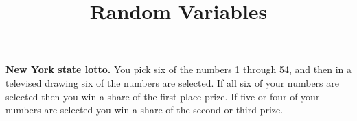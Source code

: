 \documentclass[11pt]{exam}
\title{Random Variables}
\begin{document}
\begin{questions}


%
%
%
%
%


\question \textbf{New York state lotto.}  You pick six of the numbers 1 through
54, and then in a televised drawing six of the numbers are selected.  If all
six of your numbers are selected then you win a share of the first place
prize.  If five or four of your numbers are selected you win a share of the
second or third prize.

\end{questions}
\end{document}
